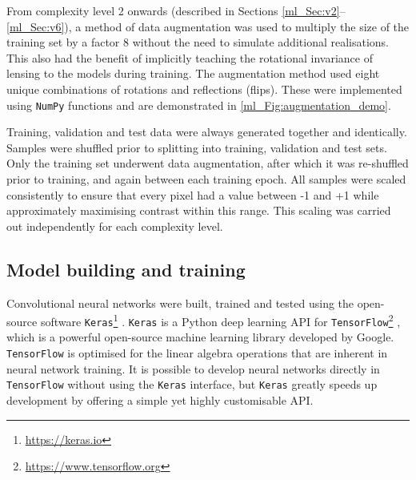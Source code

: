 From complexity level 2 onwards (described in Sections \ref{ml_Sec:v2}--\ref{ml_Sec:v6}), a method of data augmentation was used to multiply the size of the training set by a factor 8 without the need to simulate additional realisations. This also had the benefit of implicitly teaching the rotational invariance of lensing to the models during training. The augmentation method used eight unique combinations of rotations and reflections (flips). These were implemented using \texttt{NumPy} \citep{Harris2020} functions and are demonstrated in \autoref{ml_Fig:augmentation_demo}.

Training, validation and test data were always generated together and identically. Samples were shuffled prior to splitting into training, validation and test sets. Only the training set underwent data augmentation, after which it was re-shuffled prior to training, and again between each training epoch. All samples were scaled consistently to ensure that every pixel had a value between -1 and +1 while approximately maximising contrast within this range. This scaling was carried out independently for each complexity level.

\subsection{Model building and training}
\label{ml_Sec:model_building_training}

Convolutional neural networks were built, trained and tested using the open-source software \texttt{Keras}\footnote{\url{https://keras.io}} \citep{Chollet2015}. \texttt{Keras} is a Python deep learning API for \texttt{TensorFlow}\footnote{\url{https://www.tensorflow.org}} \citep{Abadi2016}, which is a powerful open-source machine learning library developed by Google. \texttt{TensorFlow} is optimised for the linear algebra operations that are inherent in neural network training. It is possible to develop neural networks directly in \texttt{TensorFlow} without using the \texttt{Keras} interface, but \texttt{Keras} greatly speeds up development by offering a simple yet highly customisable API.

